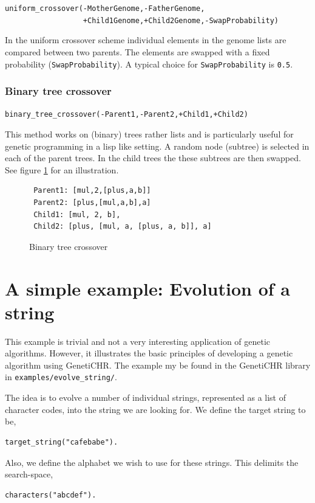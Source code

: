 \documentclass{article}
\begin{document}
\verb|uniform_crossover(-MotherGenome,-FatherGenome,|\\
\verb|                  +Child1Genome,+Child2Genome,-SwapProbability)|
\medskip

In the uniform crossover scheme individual elements in the genome lists are compared between two parents. The elements are swapped with a fixed probability (\verb|SwapProbability|). A typical choice
for \verb|SwapProbability| is \verb|0.5|.

\subsubsection{Binary tree crossover}

\verb|binary_tree_crossover(-Parent1,-Parent2,+Child1,+Child2)|

This method works on (binary) trees rather lists and is particularly useful for genetic programming in a lisp like setting. A random node (subtree) is selected in each of the parent trees. In the child trees the 
these subtrees are then swapped. See figure \ref{fig:binary_tree_crossover} for an illustration.

\begin{figure}[htb]
\caption{Binary tree crossover}
\label{fig:binary_tree_crossover}
\begin{verbatim}
 Parent1: [mul,2,[plus,a,b]]
 Parent2: [plus,[mul,a,b],a]
 Child1: [mul, 2, b],
 Child2: [plus, [mul, a, [plus, a, b]], a]
\end{verbatim}
\end{figure}

\section{A simple example: Evolution of a string}

This example is trivial and not a very interesting application of genetic algorithms. However, it illustrates the basic principles of developing
a genetic algorithm using GenetiCHR. The example my be found in the GenetiCHR library in \verb|examples/evolve_string/|.

The idea is to evolve a number of individual strings, represented as a list of character codes, into the string we are looking for. We define the 
target string to be, 
\begin{verbatim}
target_string("cafebabe").
\end{verbatim}

Also, we define the alphabet we wish to use for these strings. This delimits the search-space,
\begin{verbatim}
characters("abcdef").
\end{verbatim}
\end{document}
